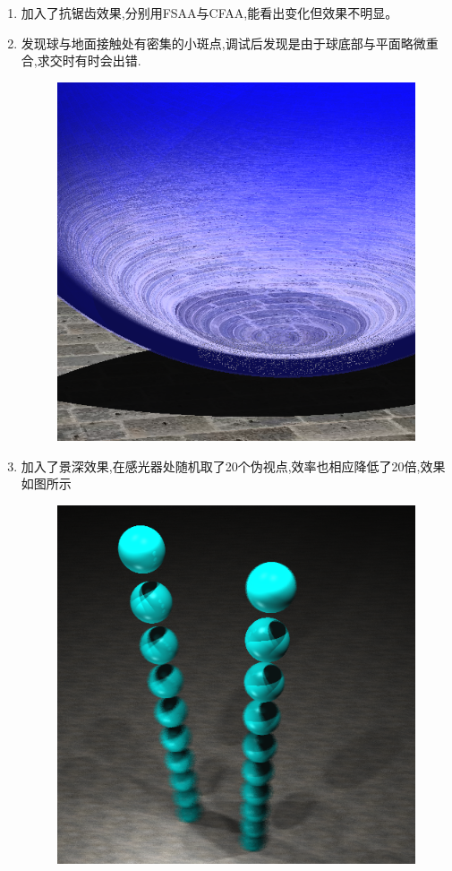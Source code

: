 \begin{enumerate}
\item 加入了抗锯齿效果,分别用FSAA与CFAA,能看出变化但效果不明显。

\item 发现球与地面接触处有密集的小斑点,调试后发现是由于球底部与平面略微重合,求交时有时会出错.
\begin{figure}[H]
  \centering
  \includegraphics[scale=0.4]{img/smallpoint.png}
\end{figure}

\item 加入了景深效果,在感光器处随机取了20个伪视点,效率也相应降低了20倍,效果如图所示
\begin{figure}[H]
  \centering
  \includegraphics[scale=0.4]{img/dof.png}
  \caption*{\label{fig:dof}}
\end{figure}


\end{enumerate}
